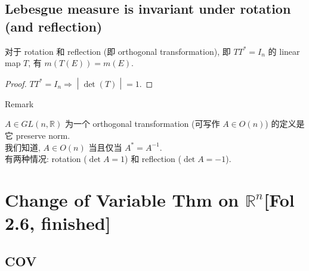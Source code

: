 \subsection{Lebesgue measure is invariant under rotation (and reflection)}\label{lebesgue-measure-is-invariant-under-rotation-and-reflection}

\begin{corollary}{}

对于 rotation 和 reflection (即 orthogonal transformation), 即 \(TT^{\ast} = I_{n}\) 的 linear map \(T\), 有 \(m(T(E)) = m(E)\).

\end{corollary}

\begin{proof}

\(\left. TT^{\ast} = I_{n}\Longrightarrow \middle| \det(T) \middle| = 1 \right.\).

\end{proof}

\begin{qlremark}{Remark}

\(A \in GL(n,\mathbb{R})\) 为一个 orthogonal transformation (可写作 \(A \in O(n)\)) 的定义是它 preserve norm.\\
我们知道, \(A \in O(n)\) 当且仅当 \(A^{\ast} = A^{- 1}\).\\
有两种情况: rotation (\(\det A = 1\)) 和 reflection (\(\det A = - 1\)).\\

\end{qlremark}

\section{\texorpdfstring{Change of Variable Thm on \(\mathbb{R}^{n}\){[}Fol 2.6, finished{]}}{Change of Variable Thm on \textbackslash mathbb\{R\}\^{}\{n\}{[}Fol 2.6, finished{]}}}

\subsection{COV}\label{cov}


